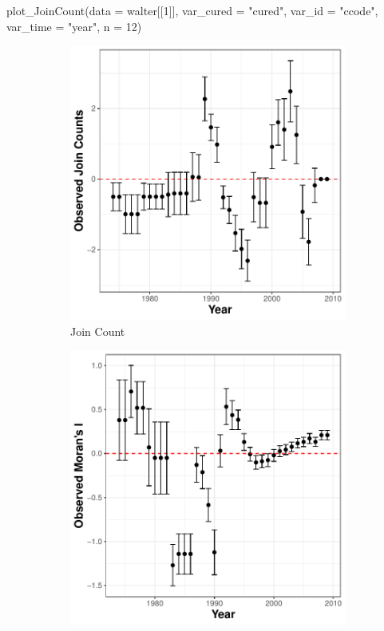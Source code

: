 \begin{example}
plot_JoinCount(data = walter[[1]], var_cured = "cured", var_id = "ccode", 
                var_time = "year", n = 12)
\end{example}

\begin{figure}[!htb]
     \centering
     \begin{subfigure}[b]{0.487\textwidth}
         \centering
         \includegraphics[width=\textwidth]{figures/JCnew.pdf}
         \caption{Join Count}
         \label{fig: joint count}
     \end{subfigure}
     \hfill
     \begin{subfigure}[b]{0.487\textwidth}
         \centering
         \includegraphics[width=\textwidth]{figures/MInew.pdf}

\end{subfigure}
\end{figure}
